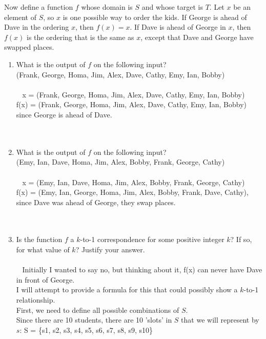 \documentclass{amsart}
\theoremstyle{definition}
\theoremstyle{Exercise}
\theoremstyle{remark}
\theoremstyle{rule}
\numberwithin{equation}{section}
\begin{document}
Now define a function $f$ whose domain is $S$ and whose target is $T$. Let $x$ be an element of $S$, so $x$ is one possible way to order the kids. If George is ahead of Dave in the ordering $x$, then $f(x) = x$. If Dave is ahead of George in $x$, then $f(x)$ is the ordering that is the same as $x$, except that Dave and George have swapped places.\\
\begin{enumerate}[label=(\alph*)]
  \item What is the output of $f$ on the following input?\\
  (Frank, George, Homa, Jim, Alex, Dave, Cathy, Emy, Ian, Bobby)\\\\\
x = (Frank, George, Homa, Jim, Alex, Dave, Cathy, Emy, Ian, Bobby)\\
f(x) = (Frank, George, Homa, Jim, Alex, Dave, Cathy, Emy, Ian, Bobby) since George is ahead of Dave.
\\\\\
  \item What is the output of $f$ on the following input?\\
(Emy, Ian, Dave, Homa, Jim, Alex, Bobby, Frank, George, Cathy)\\\\\
x = (Emy, Ian, Dave, Homa, Jim, Alex, Bobby, Frank, George, Cathy)\\
f(x) = (Emy, Ian, George, Homa, Jim, Alex, Bobby, Frank, Dave, Cathy), since Dave was ahead of George, they swap places.
\\\\\
  \item Is the function $f$ a $k$-to-1 correspondence for some positive integer $k$? If so, for what value of $k$? Justify your answer.\\\\\
Initially I wanted to say no, but thinking about it, f(x) can never have Dave in front of George.\\
I will attempt to provide a formula for this that could possibly show a $k$-to-1 relationship.\\
First, we need to define all possible combinations of $S$.\\
Since there are 10 students, there are 10 'slots' in $S$ that we will represent by $s$: S = \{s1, s2, s3, s4, s5, s6, s7, s8, s9, s10\}\\

\end{enumerate}
\end{document}
